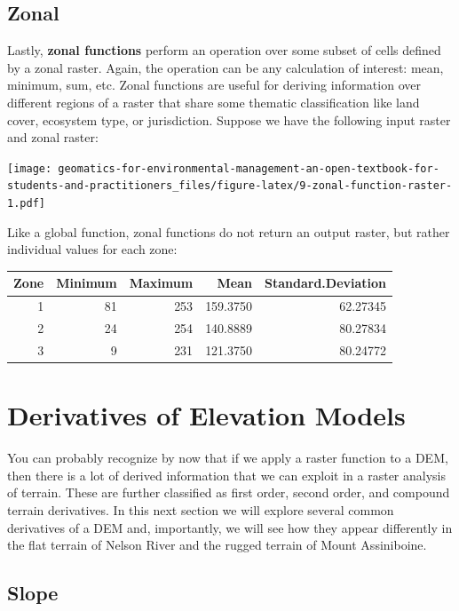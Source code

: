 \documentclass[
]{book}
\begin{document}
\subsection{Zonal}\label{zonal}

Lastly, \textbf{zonal functions} perform an operation over some subset of cells defined by a zonal raster. Again, the operation can be any calculation of interest: mean, minimum, sum, etc. Zonal functions are useful for deriving information over different regions of a raster that share some thematic classification like land cover, ecosystem type, or jurisdiction. Suppose we have the following input raster and zonal raster:

\texttt{[image: geomatics-for-environmental-management-an-open-textbook-for-students-and-practitioners\_files/figure-latex/9-zonal-function-raster-1.pdf]}

Like a global function, zonal functions do not return an output raster, but rather individual values for each zone:

\begin{tabular}{rrrrr}
\toprule
Zone & Minimum & Maximum & Mean & Standard.Deviation\\
\midrule
1 & 81 & 253 & 159.3750 & 62.27345\\
2 & 24 & 254 & 140.8889 & 80.27834\\
3 & 9 & 231 & 121.3750 & 80.24772\\
\bottomrule
\end{tabular}

\section{Derivatives of Elevation Models}\label{derivatives-of-elevation-models}

You can probably recognize by now that if we apply a raster function to a DEM, then there is a lot of derived information that we can exploit in a raster analysis of terrain. These are further classified as first order, second order, and compound terrain derivatives. In this next section we will explore several common derivatives of a DEM and, importantly, we will see how they appear differently in the flat terrain of Nelson River and the rugged terrain of Mount Assiniboine.

\subsection{Slope}\label{slope}
\end{document}

